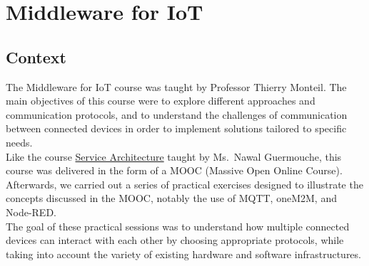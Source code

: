 


\section{Middleware for IoT}
\subsection{Context}
The Middleware for IoT course was taught by Professor Thierry Monteil. The main objectives of this course were to explore different approaches and communication protocols, and to understand the challenges of communication between connected devices in order to implement solutions tailored to specific needs.\\

Like the course \hyperref[sec:service_architecture]{Service Architecture} taught by Ms.\ Nawal Guermouche, this course was delivered in the form of a MOOC (Massive Open Online Course). Afterwards, we carried out a series of practical exercises designed to illustrate the concepts discussed in the MOOC, notably the use of MQTT, oneM2M, and Node-RED.\\

The goal of these practical sessions was to understand how multiple connected devices can interact with each other by choosing appropriate protocols, while taking into account the variety of existing hardware and software infrastructures.

